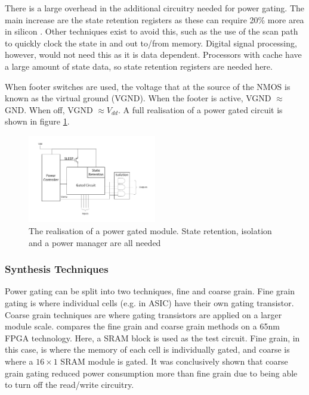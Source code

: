 There is a large overhead in the additional circuitry needed for power gating. 
The main increase are the state retention registers as these can require 20\% more area in silicon \cite{stateretarea}. 
Other techniques exist to avoid this, such as the use of the scan path to quickly clock the state in and out to/from memory.
Digital signal processing, however, would not need this as it is data dependent. 
Processors with cache have a large amount of state data, so state retention registers are needed here.

When footer switches are used, the voltage that at the source of the NMOS is known as the virtual ground (VGND). When the footer is active, VGND $\approx$ GND. When off, VGND $\approx V_{dd}$.
A full realisation of a power gated circuit is shown in figure \ref{fig:powergated}. 


\begin{figure}
\includegraphics[width=0.5\textwidth]{Figures/powergating_full.pdf}
\caption{The realisation of a power gated module. State retention, isolation and a power manager are all needed}
\label{fig:powergated}
\end{figure}


\subsubsection{Synthesis Techniques}

Power gating can be split into two techniques, fine and coarse grain.
Fine grain gating is where individual cells (e.g. in ASIC) have their own gating transistor. 
Coarse grain techniques are where gating transistors are applied on a larger module scale.
\cite{nair2009comparative} compares the fine grain and coarse grain methods on a 65nm FPGA technology. 
Here, a SRAM block is used as the test circuit. 
Fine grain, in this case, is where the memory of each cell is individually gated, and coarse is where a $16 \times 1$ SRAM module is gated. 
It was conclusively shown that coarse grain gating reduced power consumption more than fine grain due to being able to turn off the read/write circuitry. 


